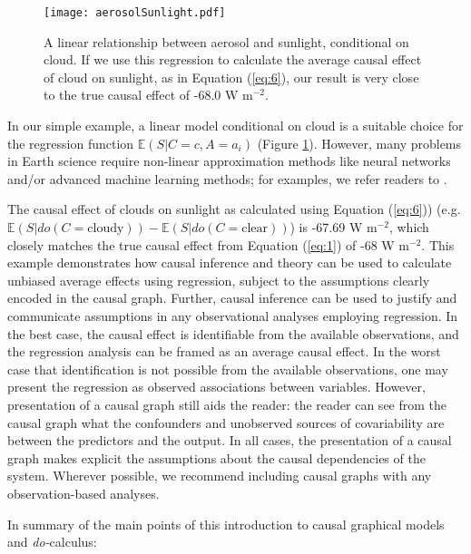 \documentclass[12pt]{article}
\begin{document}
\begin{figure} \texttt{[image: aerosolSunlight.pdf]}
  \caption{A linear relationship between aerosol and sunlight,
    conditional on cloud. If we use this regression to calculate the
    average causal effect of cloud on sunlight, as in Equation
    (\ref{eq:6}), our result is very close to the true causal effect
    of -68.0 W m$^{-2}$.}
  \label{fig:linear}
\end{figure}

In our simple example, a linear model conditional on cloud is a
suitable choice for the regression function
$\mathbb{E}(S | C=c, A=a_i)$ (Figure \ref{fig:linear}). However, many
problems in Earth science require non-linear approximation methods
like neural networks and/or advanced machine learning methods; for
examples, we refer readers to \citep{bishop2006pattern}.

The causal effect of clouds on sunlight as calculated using Equation
(\ref{eq:6})) (e.g.
$\mathbb{E}(S | do(C = \text{cloudy})) - \mathbb{E}(S | do(C =
\text{clear}))$) is -67.69 W m$^{-2}$, which closely matches the true
causal effect from Equation (\ref{eq:1}) of -68 W m$^{-2}$. This
example demonstrates how causal inference and theory can be used to
calculate unbiased average effects using regression, subject to the
assumptions clearly encoded in the causal graph. Further, causal
inference can be used to justify and communicate assumptions in any
observational analyses employing regression. In the best case, the
causal effect is identifiable from the available observations, and the
regression analysis can be framed as an average causal effect. In the
worst case that identification is not possible from the available
observations, one may present the regression as observed associations
between variables. However, presentation of a causal graph still aids
the reader: the reader can see from the causal graph what the
confounders and unobserved sources of covariability are between the
predictors and the output. In all cases, the presentation of a causal
graph makes explicit the assumptions about the causal dependencies of
the system. Wherever possible, we recommend including causal graphs
with any observation-based analyses.

In summary of the main points of this introduction to causal graphical
models and \textit{do-}calculus:
\end{document}
